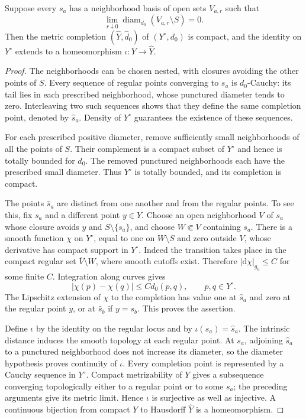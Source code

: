 \begin{lemma}\label{lem:finite-puncture-completion}
Suppose every $s_a$ has a neighborhood basis of open sets $V_{a,r}$ such that
\[
 \lim_{r\downarrow0}\operatorname{diam}_{d_0}(V_{a,r}\setminus S)=0.
\]
Then the metric completion $(\widehat Y,\widehat d_0)$ of $(Y^\circ,d_0)$ is compact, and the identity on $Y^\circ$ extends to a homeomorphism $\iota\colon Y\to\widehat Y$.
\end{lemma}
\begin{proof}
The neighborhoods can be chosen nested, with closures avoiding the other points of $S$. Every sequence of regular points converging to $s_a$ is $d_0$-Cauchy: its tail lies in each prescribed neighborhood, whose punctured diameter tends to zero. Interleaving two such sequences shows that they define the same completion point, denoted by $\widehat s_a$. Density of $Y^\circ$ guarantees the existence of these sequences.

For each prescribed positive diameter, remove sufficiently small neighborhoods of all the points of $S$. Their complement is a compact subset of $Y^\circ$ and hence is totally bounded for $d_0$. The removed punctured neighborhoods each have the prescribed small diameter. Thus $Y^\circ$ is totally bounded, and its completion is compact.

The points $\widehat s_a$ are distinct from one another and from the regular points. To see this, fix $s_a$ and a different point $y\in Y$. Choose an open neighborhood $V$ of $s_a$ whose closure avoids $y$ and $S\setminus\{s_a\}$, and choose $W\Subset V$ containing $s_a$. There is a smooth function $\chi$ on $Y^\circ$, equal to one on $W\setminus S$ and zero outside $V$, whose derivative has compact support in $Y^\circ$. Indeed the transition takes place in the compact regular set $\overline V\setminus W$, where smooth cutoffs exist. Therefore $|\mathrm{d}\chi|_{g_0}\leq C$ for some finite $C$. Integration along curves gives
\[
 |\chi(p)-\chi(q)|\leq C d_0(p,q),\qquad p,q\in Y^\circ.
\]
The Lipschitz extension of $\chi$ to the completion has value one at $\widehat s_a$ and zero at the regular point $y$, or at $\widehat s_b$ if $y=s_b$. This proves the assertion.

Define $\iota$ by the identity on the regular locus and by $\iota(s_a)=\widehat s_a$. The intrinsic distance induces the smooth topology at each regular point. At $s_a$, adjoining $\widehat s_a$ to a punctured neighborhood does not increase its diameter, so the diameter hypothesis proves continuity of $\iota$. Every completion point is represented by a Cauchy sequence in $Y^\circ$. Compact metrizability of $Y$ gives a subsequence converging topologically either to a regular point or to some $s_a$; the preceding arguments give its metric limit. Hence $\iota$ is surjective as well as injective. A continuous bijection from compact $Y$ to Hausdorff $\widehat Y$ is a homeomorphism.
\end{proof}

